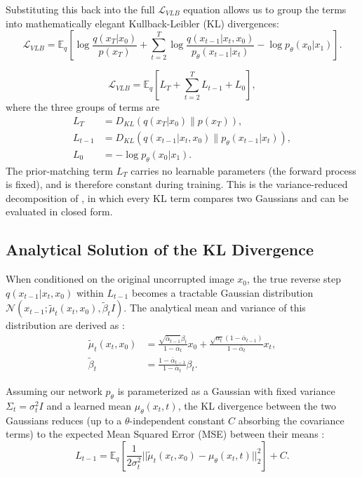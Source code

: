 Substituting this back into the full $\mathcal{L}_{VLB}$ equation allows us to group the terms into mathematically elegant Kullback-Leibler (KL) divergences:
\begin{equation}
    \mathcal{L}_{VLB} = \mathbb{E}_q \left[ \log \frac{q(x_T|x_0)}{p(x_T)} + \sum_{t=2}^T \log \frac{q(x_{t-1}|x_t, x_0)}{p_\theta(x_{t-1}|x_t)} - \log p_\theta(x_0|x_1) \right].
\end{equation}

\begin{equation}
    \mathcal{L}_{VLB} = \mathbb{E}_q \left[ L_T + \sum_{t=2}^T L_{t-1} + L_0 \right],
\end{equation}
where the three groups of terms are
\begin{align}
    L_T &= D_{KL}(q(x_T | x_0) \parallel p(x_T)), \\
    L_{t-1} &= D_{KL}(q(x_{t-1} | x_t, x_0) \parallel p_\theta(x_{t-1} | x_t)), \\
    L_0 &= -\log p_\theta(x_0 | x_1).
\end{align}
The prior-matching term $L_T$ carries no learnable parameters (the forward process is fixed), and is therefore constant during training. This is the variance-reduced decomposition of \textcite{ho_denoising_2020}, in which every KL term compares two Gaussians and can be evaluated in closed form.

\subsection{Analytical Solution of the KL Divergence}
\label{app:diffusion_kl}

When conditioned on the original uncorrupted image $x_0$, the true reverse step $q(x_{t-1}|x_t, x_0)$ within $L_{t-1}$ becomes a tractable Gaussian distribution $\mathcal{N}(x_{t-1}; \tilde{\mu}_t(x_t, x_0), \tilde{\beta}_t I)$. The analytical mean and variance of this distribution are derived as \parencite{ho_denoising_2020}:
\begin{align}
    \tilde{\mu}_t(x_t, x_0) &= \frac{\sqrt{\overline{\alpha}_{t-1}}\beta_t}{1-\overline{\alpha}_t}x_0 + \frac{\sqrt{\alpha_t}(1-\overline{\alpha}_{t-1})}{1-\overline{\alpha}_t}x_t, \\
    \tilde{\beta}_t &= \frac{1-\overline{\alpha}_{t-1}}{1-\overline{\alpha}_t}\beta_t.
\end{align}

Assuming our network $p_\theta$ is parameterized as a Gaussian with fixed variance $\Sigma_t = \sigma_t^2 I$ and a learned mean $\mu_\theta(x_t, t)$, the KL divergence between the two Gaussians reduces (up to a $\theta$-independent constant $C$ absorbing the covariance terms) to the expected Mean Squared Error (MSE) between their means \parencite{ho_denoising_2020}:
\begin{equation}
    L_{t-1} = \mathbb{E}_q \left[ \frac{1}{2\sigma_t^2} ||\tilde{\mu}_t(x_t, x_0) - \mu_\theta(x_t, t)||_2^2 \right] + C.
\end{equation}

